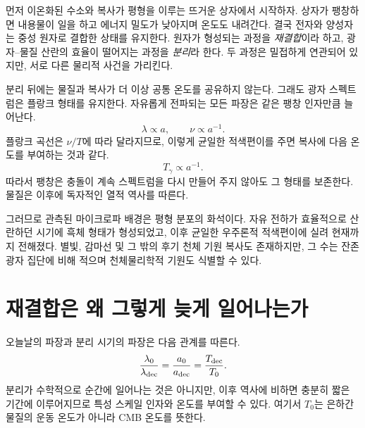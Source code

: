 먼저 이온화된 수소와 복사가 평형을 이루는 뜨거운 상자에서 시작하자. 상자가 팽창하면 내용물이 일을 하고 에너지 밀도가 낮아지며 온도도 내려간다. 결국 전자와 양성자는 중성 원자로 결합한 상태를 유지한다. 원자가 형성되는 과정을 \emph{재결합}이라 하고, 광자--물질 산란의 효율이 떨어지는 과정을 \emph{분리}라 한다. 두 과정은 밀접하게 연관되어 있지만, 서로 다른 물리적 사건을 가리킨다.

분리 뒤에는 물질과 복사가 더 이상 공통 온도를 공유하지 않는다. 그래도 광자 스펙트럼은 플랑크 형태를 유지한다. 자유롭게 전파되는 모든 파장은 같은 팽창 인자만큼 늘어난다.
\begin{equation}
\lambda\propto a,
\qquad
\nu\propto a^{-1}.
\end{equation}
플랑크 곡선은 \(\nu/T\)에 따라 달라지므로, 이렇게 균일한 적색편이를 주면 복사에 다음 온도를 부여하는 것과 같다.
\begin{equation}
\boxed{T_\gamma\propto a^{-1}.}
\label{eq:c07-temperature-scaling}
\end{equation}
따라서 팽창은 충돌이 계속 스펙트럼을 다시 만들어 주지 않아도 그 형태를 보존한다. 물질은 이후에 독자적인 열적 역사를 따른다.

그러므로 관측된 마이크로파 배경은 평형 분포의 화석이다. 자유 전하가 효율적으로 산란하던 시기에 흑체 형태가 형성되었고, 이후 균일한 우주론적 적색편이에 실려 현재까지 전해졌다. 별빛, 감마선 및 그 밖의 후기 천체 기원 복사도 존재하지만, 그 수는 잔존 광자 집단에 비해 적으며 천체물리학적 기원도 식별할 수 있다.

\begin{classroomqa}
\end{classroomqa}

\section{재결합은 왜 그렇게 늦게 일어나는가}

오늘날의 파장과 분리 시기의 파장은 다음 관계를 따른다.
\begin{equation}
\frac{\lambda_0}{\lambda_{\rm dec}}
=
\frac{a_0}{a_{\rm dec}}
=
\frac{T_{\rm dec}}{T_0}.
\label{eq:c07-decoupling-ratio}
\end{equation}
분리가 수학적으로 순간에 일어나는 것은 아니지만, 이후 역사에 비하면 충분히 짧은 기간에 이루어지므로 특성 스케일 인자와 온도를 부여할 수 있다. 여기서 \(T_0\)는 은하간 물질의 운동 온도가 아니라 CMB 온도를 뜻한다.


